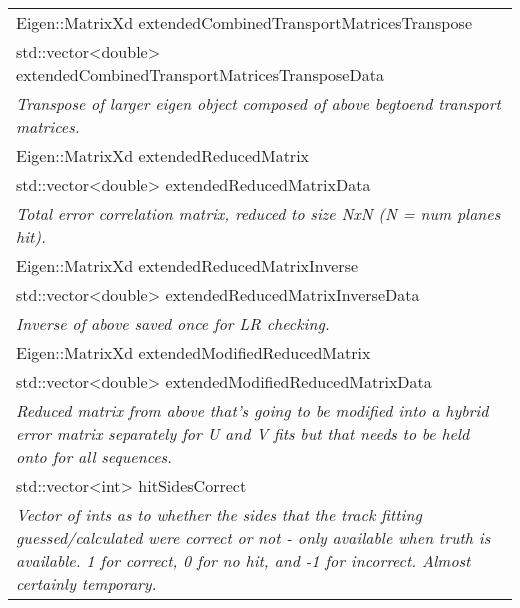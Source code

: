 \begin{longtable}{|p{16cm}|}
Eigen::MatrixXd extendedCombinedTransportMatricesTranspose \\
std::vector\textless{}double\textgreater{} extendedCombinedTransportMatricesTransposeData \\
\textit{Transpose of larger eigen object composed of above begtoend transport matrices.} \\ \hline

Eigen::MatrixXd extendedReducedMatrix \\
std::vector\textless{}double\textgreater{} extendedReducedMatrixData \\ 
\textit{Total error correlation matrix, reduced to size NxN (N = num planes hit).} \\ \hline

Eigen::MatrixXd extendedReducedMatrixInverse \\ 
std::vector\textless{}double\textgreater{} extendedReducedMatrixInverseData \\
\textit{Inverse of above saved once for LR checking.} \\ \hline

Eigen::MatrixXd extendedModifiedReducedMatrix \\ 
std::vector\textless{}double\textgreater{} extendedModifiedReducedMatrixData \\
\textit{Reduced matrix from above that's going to be modified into a hybrid error matrix separately for U and V fits but that needs to be held onto for all sequences.} \\ \hline



std::vector\textless{}int\textgreater{} hitSidesCorrect \\
\textit{Vector of ints as to whether the sides that the track fitting guessed/calculated were correct or not - only available when truth is available. 1 for correct, 0 for no hit, and -1 for incorrect. Almost certainly temporary.} \\ \hline


  \hline

\end{longtable}
